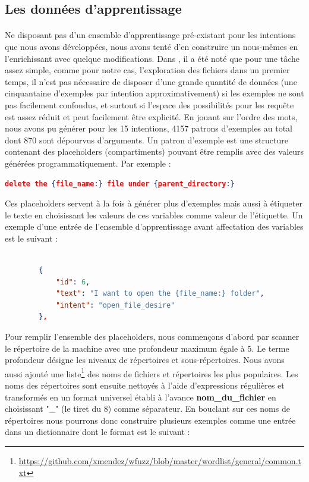 		\subsection{Les données d'apprentissage}
		\paragraph{}
		\label{nlu_dataset}
		Ne disposant pas d'un ensemble d'apprentissage pré-existant pour les intentions que nous avons développées, nous avons tenté d'en construire un nous-mêmes en l'enrichissant avec quelque modifications. Dans \citep{rasa_nlu}, il a été noté que pour une tâche assez simple, comme pour notre cas, l'exploration des fichiers dans un premier temps, il n'est pas nécessaire de disposer d'une grande quantité de données (une cinquantaine d'exemples par intention approximativement) si les exemples ne sont pas facilement confondus, et surtout si l'espace des possibilités pour les requête est assez réduit et peut facilement être explicité. En jouant sur l'ordre des mots, nous avons pu générer pour les 15 intentions, 4157 patrons d'exemples au total dont 870 sont dépourvus d'arguments. Un patron d'exemple est une structure contenant des placeholders (compartiments) pouvant être remplis avec des valeurs générées programmatiquement. Par exemple : 
		\begin{lstlisting}[language=json]
		delete the {file_name:} file under {parent_directory:}\end{lstlisting}
		Ces placeholders servent à la fois à générer plus d'exemples mais aussi à étiqueter le texte en choisissant les valeurs de ces variables comme valeur de l'étiquette. Un exemple d'une entrée de l'ensemble d'apprentissage avant affectation des variables est le suivant : 
		\begin{lstlisting}[language=json]
		
		{
			"id": 6,
			"text": "I want to open the {file_name:} folder",
			"intent": "open_file_desire"
		},
		\end{lstlisting}
		Pour remplir l'ensemble des placeholders, nous commençons d'abord par scanner le répertoire de la machine avec une profondeur maximum égale à 5. Le terme profondeur désigne les niveaux de répertoires et sous-répertoires. Nous avons aussi ajouté une liste\footnote{\url{https://github.com/xmendez/wfuzz/blob/master/wordlist/general/common.txt}} des noms de fichiers et répertoires les plus populaires.
		Les noms des répertoires sont ensuite nettoyés à l'aide d'expressions régulières et transformés en un format universel établi à l'avance \textbf{nom\_du\_fichier} en choisissant "\_" (le tiret du 8) comme séparateur. En bouclant sur ces noms de répertoires nous pourrons donc construire plusieurs exemples comme une entrée dans un dictionnaire dont le format est le suivant : 
